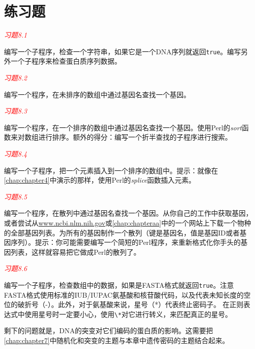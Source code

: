 \section{练习题}
\textcolor{red}{\textit{习题8.1}}
\begin{adjustwidth}{1cm}{}
编写一个子程序，检查一个字符串，如果它是一个DNA序列就返回\verb|true|。编写另外一个子程序来检查蛋白质序列数据。
\end{adjustwidth}

\textcolor{red}{\textit{习题8.2}}
\begin{adjustwidth}{1cm}{}
编写一个程序，在未排序的数组中通过基因名查找一个基因。
\end{adjustwidth}

\textcolor{red}{\textit{习题8.3}}
\begin{adjustwidth}{1cm}{}
编写一个程序，在一个排序的数组中通过基因名查找一个基因。使用Perl的\textit{sort}函数来对数组进行排序。额外的得分：编写一个折半查找的子程序进行搜索。
\end{adjustwidth}

\textcolor{red}{\textit{习题8.4}}
\begin{adjustwidth}{1cm}{}
编写一个子程序，把一个元素插入到一个排序的数组中。提示：就像在\autoref{chap:chapter4}中演示的那样，使用Perl的\textit{splice}函数插入元素。
\end{adjustwidth}

\textcolor{red}{\textit{习题8.5}}
\begin{adjustwidth}{1cm}{}
编写一个程序，在散列中通过基因名查找一个基因。从你自己的工作中获取基因，或者尝试从\href{www.ncbi.nlm.nih.gov}{www.ncbi.nlm.nih.gov}或\autoref{chap:chapteraa}中的一个网站上下载一个物种的全部基因列表。为所有的基因制作一个散列（键是基因名，值是基因ID或者基因序列）。提示：你可能需要编写一个简短的Perl程序，来重新格式化你手头的基因列表，这样就容易把它做成Perl的散列了。
\end{adjustwidth}

\textcolor{red}{\textit{习题8.6}}
\begin{adjustwidth}{1cm}{}
编写一个子程序，检查数组中的数据，如果是FASTA格式就返回\verb|true|。注意FASTA格式使用标准的IUB/IUPAC氨基酸和核苷酸代码，以及代表未知长度的空位的破折号（-）。此外，对于氨基酸来说，星号（*）代表终止密码子。 在正则表达式中使用星号时一定要小心，使用\verb|\*|对它进行转义，来匹配真正的星号。
\end{adjustwidth}

剩下的问题就是，DNA的突变对它们编码的蛋白质的影响。这需要把\autoref{chap:chapter7}中随机化和突变的主题与本章中遗传密码的主题结合起来。

